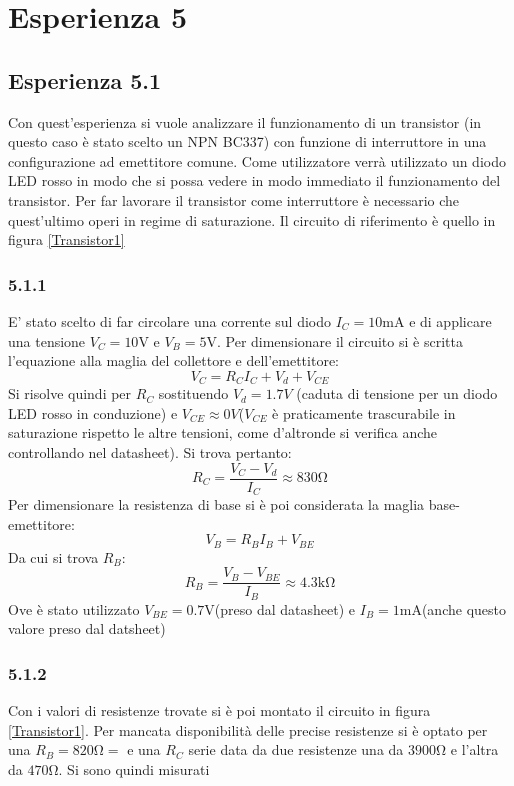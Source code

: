 \section{Esperienza 5}
\subsection{Esperienza 5.1}
Con quest'esperienza si vuole analizzare il funzionamento di un transistor (in questo caso è stato scelto un NPN BC337) con funzione di interruttore in una configurazione ad emettitore comune. Come utilizzatore verrà utilizzato un diodo LED rosso in modo che si possa vedere in modo immediato il funzionamento del transistor. Per far lavorare il transistor come interruttore è necessario che quest'ultimo operi in regime di saturazione. Il circuito di riferimento è quello in figura \ref{Transistor1}
\subsubsection{5.1.1}
E' stato scelto di far circolare una corrente sul diodo $I_C=10\unit{\mA}$ e di applicare una tensione $V_C=10\unit{\V}$ e $V_B=5\unit{\V}$. Per dimensionare il circuito si è scritta l'equazione alla maglia del collettore e dell'emettitore:
\begin{equation*}
    V_C=R_C I_C + V_d +V_{CE}
\end{equation*}
Si risolve quindi per $R_C$ sostituendo $V_d=1.7V$ (caduta di tensione per un diodo LED rosso in conduzione) e $V_{CE}\approx 0V$($V_{CE}$ è praticamente trascurabile in saturazione rispetto le altre tensioni, come d'altronde si verifica anche controllando nel datasheet). Si trova pertanto:
\begin{equation*}
    R_C=\frac{V_C-V_d}{{I_C}}\approx 830\unit{\ohm}
\end{equation*}
Per dimensionare la resistenza di base si è poi considerata la maglia base-emettitore:
\begin{equation*}
    V_B=R_B I_B+V_{BE}
\end{equation*}
Da cui si trova $R_B$:
\begin{equation*}
    R_B=\frac{V_B-V_{BE}}{I_B} \approx 4.3 \unit{\kohm}
\end{equation*}
Ove è stato utilizzato $V_{BE}=0.7\unit{\V}$(preso dal datasheet) e $I_B=1\unit{\mA}$(anche questo valore preso dal datsheet)
\subsubsection{5.1.2}
Con i valori di resistenze trovate si è poi montato il circuito in figura \ref{Transistor1}. Per mancata disponibilità delle precise resistenze si è optato per una $R_B=820\unit{\ohm}=$ e una $R_C$ serie data da due resistenze una da $3900\unit{\ohm}$ e l'altra da $470\unit{\ohm}$. Si sono quindi misurati 

